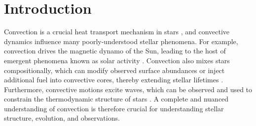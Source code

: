 \documentclass[twocolumn]{aastex631}
\begin{document}
\section{Introduction}
\label{sec:introduction}
Convection is a crucial heat transport mechanism in stars \citep{woosley_etal_2002, hansen_etal_2004, christensen-dalsgaard_2021}, and convective dynamics influence many poorly-understood stellar phenomena.
For example, convection drives the magnetic dynamo of the Sun, leading to the host of emergent phenomena known as solar activity \citep{brun_browning_2017}.
Convection also mixes stars compositionally, which can modify observed surface abundances or inject additional fuel into convective cores, thereby extending stellar lifetimes \citep{salaris_cassisi_2017}.
Furthermore, convective motions excite waves, which can be observed and used to constrain the thermodynamic structure of stars \citep{aerts2010, basu2016}.
A complete and nuanced understanding of convection is therefore crucial for understanding stellar structure, evolution, and observations.
\end{document}

